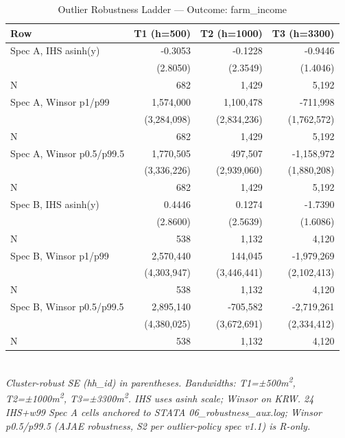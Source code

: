 \begin{table}[t]
\centering
\caption{Outlier Robustness Ladder --- Outcome: farm\_income}
\label{tab:rob_outlier_farm_income_en}
\begin{tabular}{lrrr}
\toprule
Row & T1 (h=500) & T2 (h=1000) & T3 (h=3300) \\
\midrule
Spec A, IHS asinh(y) & -0.3053 & -0.1228 & -0.9446 \\
        & (2.8050) & (2.3549) & (1.4046) \\
N       & 682 & 1,429 & 5,192 \\
Spec A, Winsor p1/p99 & 1,574,000 & 1,100,478 & -711,998 \\
        & (3,284,098) & (2,834,236) & (1,762,572) \\
N       & 682 & 1,429 & 5,192 \\
Spec A, Winsor p0.5/p99.5 & 1,770,505 & 497,507 & -1,158,972 \\
        & (3,336,226) & (2,939,060) & (1,880,208) \\
N       & 682 & 1,429 & 5,192 \\
Spec B, IHS asinh(y) & 0.4446 & 0.1274 & -1.7390 \\
        & (2.8600) & (2.5639) & (1.6086) \\
N       & 538 & 1,132 & 4,120 \\
Spec B, Winsor p1/p99 & 2,570,440 & 144,045 & -1,979,269 \\
        & (4,303,947) & (3,446,441) & (2,102,413) \\
N       & 538 & 1,132 & 4,120 \\
Spec B, Winsor p0.5/p99.5 & 2,895,140 & -705,582 & -2,719,261 \\
        & (4,380,025) & (3,672,691) & (2,334,412) \\
N       & 538 & 1,132 & 4,120 \\
\bottomrule
\end{tabular}
\\
\footnotesize\textit{Cluster-robust SE (hh\_id) in parentheses. Bandwidths: T1=±500m\textsuperscript{2}, T2=±1000m\textsuperscript{2}, T3=±3300m\textsuperscript{2}. IHS uses asinh scale; Winsor on KRW. 24 IHS+w99 Spec A cells anchored to STATA 06\_robustness\_aux.log; Winsor p0.5/p99.5 (AJAE robustness, S2 per outlier-policy spec v1.1) is R-only.}
\end{table}


